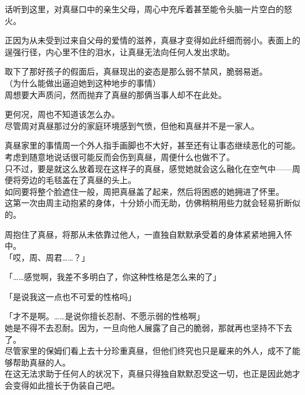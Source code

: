 话听到这里，对真昼口中的亲生父母，周心中充斥着甚至能令头脑一片空白的怒火。

正因为从未受到过来自父母的爱情的滋养，真昼才变得如此纤细而弱小。表面上的逞强行径，内心里不住的泪水，让真昼无法向任何人发出求助。

\vspace{2\baselineskip}

取下了那好孩子的假面后，真昼现出的姿态是那么弱不禁风，脆弱易逝。\\

（为什么能做出逼迫她到这种地步的事情）\\

周想要大声质问，然而抛弃了真昼的那俩当事人却不在此处。

更何况，周也不知道该怎么办。\\

尽管周对真昼那过分的家庭环境感到气愤，但他和真昼并不是一家人。

真昼家里的事情周一个外人指手画脚也不大好，甚至还有让事态继续恶化的可能。考虑到随意地说话很可能反而会伤到真昼，周便什么也做不了。\\

只不过，要是就这么放着现在这样子的真昼，感觉她就会这么融化在空气中——周便将旁边的毛毯盖在了真昼的头上。\\

如同要将整个脸遮住一般，周把真昼盖了起来，然后将困惑的她拥进了怀里。\\

这第一次由周主动抱紧的身体，十分娇小而无助，仿佛稍稍用些力就会轻易折断似的。

周抱住了真昼，将那从未依靠过他人，一直独自默默承受着的身体紧紧地拥入怀中。\\

「哎，周、周君……？」

「……感觉啊，我差不多明白了，你这种性格是怎么来的了」

「是说我这一点也不可爱的性格吗」

「才不是啊。……是说你擅长忍耐、不愿示弱的性格啊」\\

她是不得不去忍耐。因为，一旦向他人展露了自己的脆弱，那就再也坚持不下去了。\\

尽管家里的保姆们看上去十分珍重真昼，但他们终究也只是雇来的外人，成不了能够帮助真昼的人。\\

在这无法求助于任何人的状况下，真昼只得独自默默忍受这一切，也正是因此她才会变得如此擅长于伪装自己吧。\\

